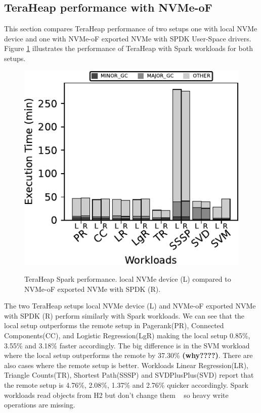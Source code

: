 \subsection{TeraHeap performance with NVMe-oF}
\par This section compares TeraHeap performance of two setups one with local NVMe device and one with NVMe-oF exported NVMe with SPDK User-Space drivers. Figure \ref{fig:bench_spark} illustrates the performance of TeraHeap with Spark workloads for both setups. 
\begin{figure}[H]
  \includegraphics[width=\linewidth]{figures/bench_spark.pdf}\\
\caption{TeraHeap Spark performance. local NVMe device (L) compared to NVMe-oF exported NVMe with SPDK (R).}
\label{fig:bench_spark}
\end{figure}
The two TeraHeap setups local NVMe device (L) and NVMe-oF exported NVMe with
SPDK (R) perform similarly with Spark workloads. We can see that the local setup
outperforms the remote setup in Pagerank(PR), Connected Components(CC), and
Logistic Regression(LgR) making the local setup 0.85\%, 3.55\% and 3.18\% faster
accordingly. The big difference is in the SVM workload where the local setup
outperforms the remote by 37.30\% \textbf{(why????)}. There are also cases where
the remote setup is better. Workloads Linear Regression(LR), Triangle
Counts(TR), Shortest Path(SSSP) and SVDPlusPlus(SVD) report that the remote
setup is 4.76\%, 2.08\%, 1.37\% and 2.76\% quicker accordingly. Spark workloads
read objects from H2 but don't change them  ~\cite{spark,teraheap} so heavy
write operations are missing.

